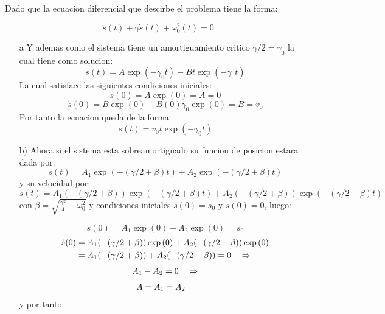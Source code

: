 \documentclass[a4paper]{article}
\begin{document}
    \begin{answer}[Problema 7]
       
        Dado que la ecuacion diferencial que descirbe el problema tiene la forma:
        
        \begin{equation*}
            \ddot{s}(t) + \gamma\dot s(t) + \omega_0^2(t) = 0
        \end{equation*}
         \begin{enumerate}
            \item [a] Y ademas como el sistema tiene un amortiguamiento critico $\gamma/2 =  \gamma_0$ la cual tiene como solucion:
        $$s(t) = A\exp(-\gamma_0t)  - Bt\exp(-\gamma_0 t)$$
        La cual satisface las siguientes condiciones iniciales:
        $$s(0) = A\exp(0) = A = 0 $$
        $$\dot s(0) = B\exp(0) -B(0)\gamma_0\exp(0) = B = v_0$$
        Por tanto la ecuacion queda de la forma:
        $$s(t) = v_0t\exp{(-\gamma_0t)}$$
        \item[b)] Ahora si el sistema esta sobreamortiguado su funcion de posicion estara dada por: 
        $$s(t) = A_1\exp{(-(\gamma/2 + \beta )t)}+ A_2\exp{(-(\gamma/2 + \beta )t)}$$
        y su velocidad por:
        $$\dot s(t) = A_1(-(\gamma/2 + \beta ))\exp{(-(\gamma/2 + \beta )t)} + A_2(-(\gamma/2 + \beta ))\exp{(-(\gamma/2 - \beta )t)}$$
        con $\beta = \sqrt{\frac{\gamma^2}{4} - \omega_0^2}$ y condiciones iniciales $s(0) = s_0$ y $\dot s(0) = 0 $, luego:
        
        \begin{equation*}
            s(0) = A_1\exp{(0)} + A_2\exp{(0)} = s_0
        \end{equation*}
        \begin{equation*}
        \begin{split}
            \dot s(0) &= A_1(-(\gamma/2 + \beta ))\exp{(0)} + A_2(-(\gamma/2 - \beta ))\exp{(0)}\\
            &= A_1(-(\gamma/2 + \beta )) + A_2(-(\gamma/2 - \beta )) =0 \hspace{0.35cm} \Rightarrow\\
        \end{split}
        \end{equation*}
        \begin{equation*}
        \begin{split}
         A_1 - A_2 =0 \hspace{0.35cm} \Rightarrow\\
        \end{split}
        \end{equation*}
        \begin{equation*}
        \begin{split}
         A  = A_1 = A_2 \hspace{0.35cm} \\
        \end{split}
        \end{equation*}
              y por tanto:
       

\end{enumerate}
\end{answer}
\end{document}
